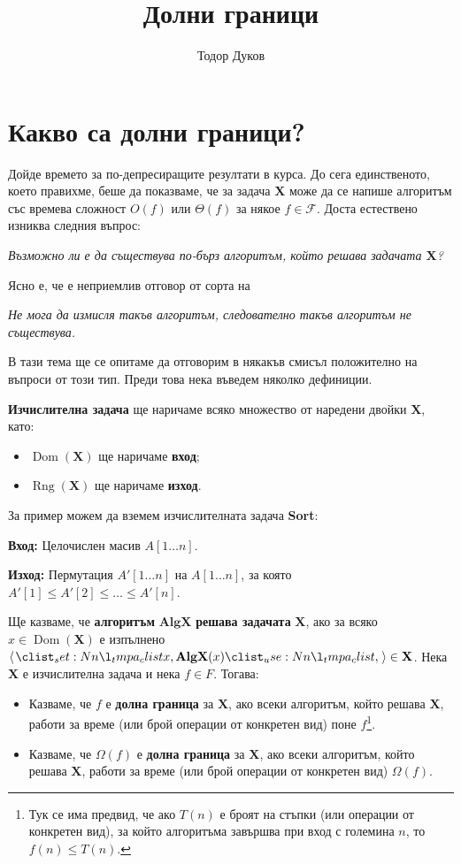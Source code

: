 \documentclass{article}
\title{Долни граници}
\author{Тодор Дуков}
\date{}
\theoremstyle{definition}
\theoremstyle{plain}
\theoremstyle{remark}
\theoremstyle{definition}
\begin{document}
\maketitle

\section*{Какво са долни граници?}

Дойде времето за по-депресиращите резултати в курса.
До сега единственото, което правихме, беше да показваме, че за задача $\mathbf{X}$ може да се напише алгоритъм със времева сложност $O(f)$ или $\Theta(f)$ за някое $f \in \mathcal{F}$.
Доста естествено изниква следния въпрос:
\begin{center}
    \textit{Възможно ли е да съществува по-бърз алгоритъм, който решава задачата $\mathbf{X}$?}
\end{center}
Ясно е, че е неприемлив отговор от сорта на
\begin{center}
    \textit{Не мога да измисля такъв алгоритъм, следователно такъв алгоритъм не съществува.}
\end{center}
В тази тема ще се опитаме да отговорим в някакъв смисъл положително на въпроси от този тип.
Преди това нека въведем няколко дефиниции.

\textbf{Изчислителна задача} ще наричаме всяко множество от наредени двойки $\mathbf{X}$, като:
\begin{itemize}
    \item $\operatorname{Dom}(\mathbf{X})$ ще наричаме \textbf{вход};
    \item $\operatorname{Rng}(\mathbf{X})$ ще наричаме \textbf{изход}.
\end{itemize}
За пример можем да вземем изчислителната задача \textbf{Sort}:

\vspace*{2mm}
\textbf{Вход:} Целочислен масив $A[1 \dots n]$.

\textbf{Изход:} Пермутация $A'[1 \dots n]$ на $A[1 \dots n]$, за която $A'[1] \leq A'[2] \leq \dots \leq A'[n]$.
\vspace*{2mm}

Ще казваме, че \textbf{алгоритъм} $\mathbf{AlgX}$ \textbf{решава задачата} $\mathbf{X}$, ако за всяко $x \in \operatorname{Dom}(\mathbf{X})$ е изпълнено $\opair{x, \mathbf{AlgX}(x)} \in \mathbf{X}$.
Нека $\mathbf{X}$ е изчислителна задача и нека $f \in F$.
Тогава:
\begin{itemize}
    \item Казваме, че $f$ е \textbf{долна граница} за $\mathbf{X}$, ако всеки алгоритъм, който решава $\mathbf{X}$, работи за време (или брой операции от конкретен вид) поне $f$\footnote{
              Тук се има предвид, че ако $T(n)$ е броят на стъпки (или операции от конкретен вид), за който алгоритъма завършва при вход с големина $n$, то $f(n) \leq T(n)$.
          }.
    \item Казваме, че $\Omega(f)$ е \textbf{долна граница} за $\mathbf{X}$, ако всеки алгоритъм, който решава $\mathbf{X}$, работи за време (или брой операции от конкретен вид) $\Omega(f)$.
\end{itemize}
\end{document}
